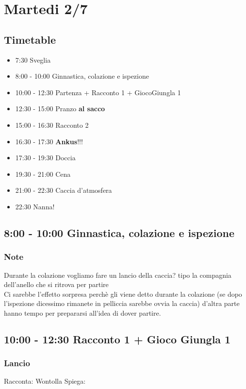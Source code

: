 \documentclass[../main.tex]{subfiles}
\begin{document}
   \section{Martedi 2/7}
   \subsection{Timetable}
   \begin{itemize}
        \item 7:30 Sveglia
        \item 8:00 - 10:00 Ginnastica, colazione e ispezione
        \item 10:00 - 12:30 Partenza + Racconto 1 + GiocoGiungla 1
        \item 12:30 - 15:00 Pranzo \textbf{al sacco}
        \item 15:00 - 16:30 Racconto 2
        \item 16:30 - 17:30 \textbf{Ankus}!!!
        \item 17:30 - 19:30 Doccia
        \item 19:30 - 21:00 Cena
        \item 21:00 - 22:30 Caccia d'atmosfera
        \item 22:30 Nanna!
    \end{itemize}

    \subsection{8:00 - 10:00 Ginnastica, colazione e ispezione}
        \subsubsection{Note}
        Durante la colazione vogliamo fare un lancio della caccia? tipo la compagnia dell'anello che si ritrova per partire \\ 
        Ci sarebbe l'effetto sorpresa perchè gli viene detto durante la colazione (se dopo l'ispezione dicessimo rimanete in pelliccia sarebbe ovvia la caccia) d'altra parte hanno tempo per prepararsi all'idea di dover partire.
    \subsection{10:00 - 12:30 Racconto 1 + Gioco Giungla 1}
       \subsubsection{Lancio}
        Racconta: Wontolla
        Spiega:
\end{document}
